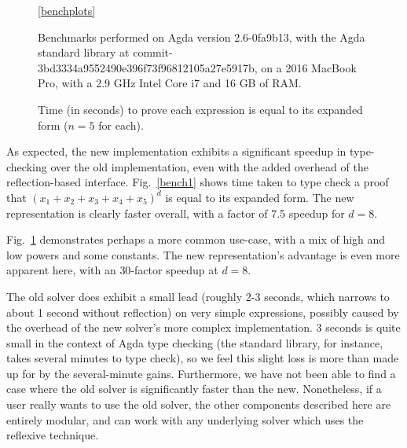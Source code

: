 \documentclass[acmsmall,review,anonymous]{acmart}\settopmatter{printfolios=true,printccs=false,printacmref=false}
\theoremstyle{remark}
\begin{document}
\begin{figure}[t]
\begin{subfigure}[t]{0.3\textwidth}
    \label{bench3}
  \end{subfigure}
  \begin{minipage}{0.13\textwidth}
    \vspace{-20pt}
    \ref{benchplots}
  \end{minipage}%
  \begin{minipage}{0.87\textwidth}
    \vspace{-20pt}
    \begin{flushleft}
      \caption{Time (in seconds) to prove each expression is equal to its expanded
        form ($n = 5$ for each).}
      \label{benchmarks}
      \smallskip
      \footnotesize
      Benchmarks performed on Agda version 2.6-0fa9b13, with the Agda standard
      library at commit-3bd3334a9552490e396f73f96812105a27e5917b, on a 2016
      MacBook Pro, with a 2.9 GHz Intel Core i7 and 16 GB of RAM.
    \end{flushleft}
  \end{minipage} 
\end{figure}

As expected, the new implementation exhibits a significant speedup in
type-checking over the old implementation, even with the added overhead of the
reflection-based interface. Fig.~\ref{bench1} shows time taken to type check a
proof that \((x_1 + x_2 + x_3 + x_4 + x_5)^d\) is equal to its expanded form.
The new representation is clearly faster overall, with a factor of 7.5
speedup for \(d = 8\).

Fig.~\ref{bench3} demonstrates perhaps a more common use-case, with a mix of
high and low powers and some constants. The new representation's advantage is
even more apparent here, with an \(30\)-factor speedup at \(d = 8\).

The old solver does exhibit a small lead (roughly 2-3 seconds, which narrows
to about 1 second without reflection) on very simple expressions, possibly
caused by the overhead of the new solver's more complex implementation. 3
seconds is quite small in the context of Agda type checking (the standard
library, for instance, takes several minutes to type check), so we feel this
slight loss is more than made up for by the several-minute gains. Furthermore,
we have not been able to find a case where the old solver is significantly
faster than the new. Nonetheless, if a user really wants to use the old
solver, the other components described here are entirely modular, and can work
with any underlying solver which uses the reflexive technique.
\end{document}
